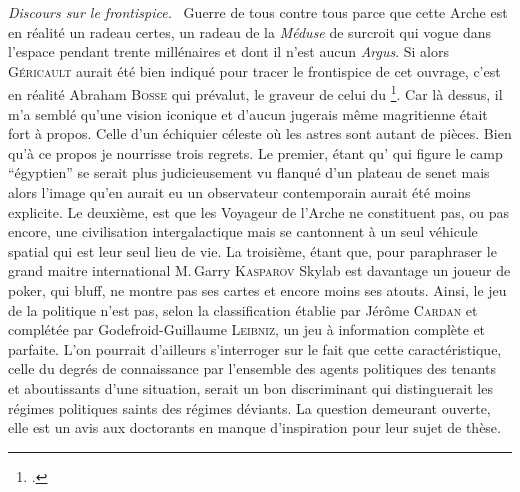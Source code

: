 {\em\normalsize Discours sur le frontispice.}~
Guerre de tous contre tous parce que cette Arche est en réalité un radeau certes, un radeau de la \emph{Méduse}\label{par:radeaumeduse} de surcroit qui vogue dans l’espace pendant trente millénaires et dont il n’est aucun \emph{Argus}. Si alors \textsc{Géricault} aurait été bien indiqué pour tracer le frontispice de cet ouvrage, c’est en réalité Abraham \textsc{Bosse} qui prévalut, le graveur de celui du \footcite{leviathan}. Car là dessus, il m’a semblé qu’une vision iconique et d’aucun jugerais même magritienne était fort à propos. Celle d’un échiquier céleste où les astres sont autant de pièces. Bien qu’à ce propos je nourrisse trois regrets. Le premier, étant qu’\elena{} qui figure le camp \enquote{égyptien} se serait plus judicieusement vu flanqué d’un plateau de senet mais alors l’image qu’en aurait eu un observateur contemporain aurait été moins explicite. Le deuxième, est que les Voyageur de l’Arche ne constituent pas, ou pas encore, une civilisation intergalactique mais se cantonnent à un seul véhicule spatial qui est leur seul lieu de vie. La troisième, étant que, pour paraphraser le grand maitre international M.\,Garry \textsc{Kasparov}  \elena{} Skylab est davantage un joueur de poker, qui bluff, ne montre pas ses cartes et encore moins ses atouts. Ainsi, le jeu de la politique n’est pas, selon la classification établie par Jérôme \textsc{Cardan} et complétée par Godefroid-Guillaume \textsc{Leibniz}, un jeu à information complète et parfaite. L’on pourrait d’ailleurs s’interroger sur le fait que cette caractéristique, celle du degrés de  connaissance par l’ensemble des agents politiques des tenants et aboutissants d’une situation, serait  un bon discriminant qui distinguerait les régimes politiques saints des régimes déviants. La question demeurant ouverte, elle est un avis aux doctorants en manque d’inspiration pour leur sujet de thèse.

